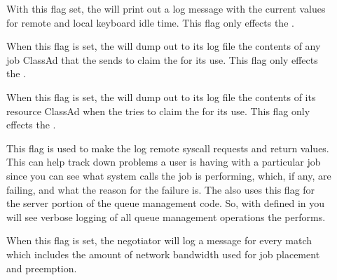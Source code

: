 \begin{description}
\begin{description}
\item[] \label{dflag:keyboard} 
  With this flag set, the  will print out a log message
  with the current values for remote and local keyboard idle time.
  This flag only effects the .

\item[] \label{dflag:job} When this flag is set, the
   will dump out to its log file the contents of any
  job ClassAd that the  sends to claim the
   for its use.  This flag only effects the
  .
  
\item[] \label{dflag:machine} When this flag is set,
  the  will dump out to its log file the contents of
  its resource ClassAd when the  tries to claim the
   for its use.  This flag only effects the
  .

\item[] \label{dflag:syscalls} This flag is used to
  make the  log remote syscall requests and return
  values.  This can help track down problems a user is having with a
  particular job since you can see what system calls the job is
  performing, which, if any, are failing, and what the reason for the
  failure is.  The  also uses this flag for the server
  portion of the queue management code.  So, with 
  defined in  you will see verbose logging of all
  queue management operations the  performs.  

\item[] \label{dflag:bandwidth} When this flag is
  set, the negotiator will log a message for every match which
  includes the amount of network bandwidth used for job placement and
  preemption.

\end{description}

\end{description}

